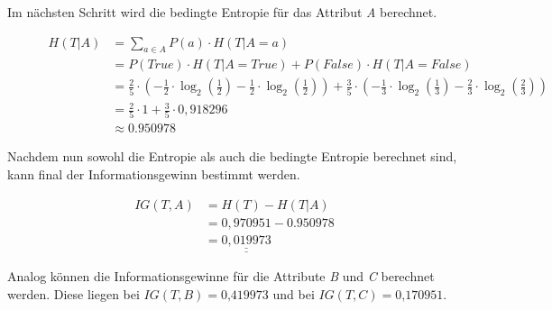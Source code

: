 Im nächsten Schritt wird die bedingte Entropie für das Attribut \textit{A} berechnet.

\begin{figure}[htbp]
    \centering
    \begin{align*}
        H(T\vert A) &= \sum\limits_{a\in A}P(a) \cdot H(T\vert A=a) \\
                    &= P(True) \cdot H(T\vert A=True) + P(False) \cdot H(T\vert A=False) \\
                    &= \frac{2}{5} \cdot \left( -\frac{1}{2} \cdot \log_2\left( \frac{1}{2} \right) - \frac{1}{2} \cdot \log_{2}\left( \frac{1}{2} \right) \right) + \frac{3}{5} \cdot \left( -\frac{1}{3} \cdot \log_{2}\left( \frac{1}{3} \right) - \frac{2}{3} \cdot \log_{2}\left( \frac{2}{3} \right) \right) \\
                    &= \frac{2}{5} \cdot 1 + \frac{3}{5} \cdot 0,918296\\
                    &\approx 0.950978
    \end{align*}
\end{figure}

Nachdem nun sowohl die Entropie als auch die bedingte Entropie berechnet sind, kann final der Informationsgewinn bestimmt werden.

\begin{figure}[h]
    \vspace{0.5cm}
    \centering
    \begin{align*}
        IG(T,A) &= H(T) - H(T\vert A) \\
                &= 0,970951 - 0.950978 \\
                &= \underline{\underline{0,019973}}
    \end{align*}
\end{figure}

Analog können die Informationsgewinne für die Attribute \textit{B} und \textit{C} berechnet werden. Diese liegen bei $ IG(T, B) = \textit{0,419973} $ und bei $ IG(T, C) = \textit{0,170951} $.

